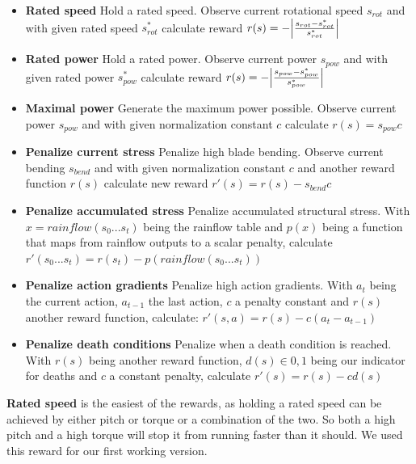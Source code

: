 \documentclass[hyperref,final,beleg]{cgvpub}
\begin{document}
\begin{itemize}

  \item \textbf{Rated speed} Hold a rated speed. Observe current rotational speed \(s_{rot}\) and with given rated speed \(s^*_{rot}\) calculate reward \(r(s) = -\abs{\frac{s_{rot} - s^*_{rot}}{s^*_{rot}}}\)

  \item \textbf{Rated power} Hold a rated power. Observe current power \(s_{pow}\) and with given rated power \(s^*_{pow}\) calculate reward \(r(s) = -\abs{\frac{s_{pow} - s^*_{pow}}{s^*_{pow}}}\)

  \item \textbf{Maximal power} Generate the maximum power possible. Observe current power \(s_{pow}\) and with given normalization constant \(c\) calculate \(r(s) = s_{pow} c\)

  \item \textbf{Penalize current stress} Penalize high blade bending. Observe current bending \(s_{bend}\) and with given normalization constant \(c\) and another reward function \(r(s)\) calculate new reward \(r'(s) = r(s) - s_{bend}c \)

  \item \textbf{Penalize accumulated stress} Penalize accumulated structural stress. With \(x = rainflow(s_0...s_t)\) being the rainflow table and \(p(x)\) being a function that maps from rainflow outputs to a scalar penalty, calculate \(r'(s_0...s_t) = r(s_t) - p(rainflow(s_0...s_t))\)

  \item \textbf{Penalize action gradients} Penalize high action gradients. With \(a_t\) being the current action, \(a_{t-1}\) the last action, \(c\) a penalty constant and \(r(s)\) another reward function, calculate: \(r'(s, a) = r(s) - c  (a_t - a_{t-1})\)

  \item \textbf{Penalize death conditions} Penalize when a death condition is reached. With $r(s)$ being another reward function, $d(s) \in {0,1}$ being our indicator for deaths and $c$ a constant penalty, calculate $r'(s) = r(s) - c  d(s)$

\end{itemize}

\textbf{Rated speed} is the easiest of the rewards, as holding a rated speed can be achieved by either pitch or torque or a combination of the two. So both a high pitch and a high torque will stop it from running faster than it should. We used this reward for our first working version.
\end{document}
